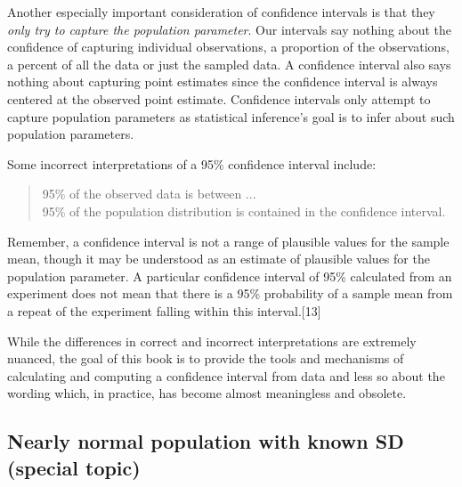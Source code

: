Another especially important consideration of confidence intervals is that they \emph{only try to capture the population parameter}. Our intervals say nothing about the confidence of capturing individual observations, a proportion of the observations, a percent of all the data or just the sampled data. A confidence interval also says nothing about capturing point estimates since the confidence interval is always centered at the observed point estimate.  Confidence intervals only attempt to capture population parameters as statistical inference's goal is to infer about such population parameters.

Some incorrect interpretations of a 95\% confidence interval include: 
\begin{quote}
95\% of the observed data is between ...\\
95\% of the population distribution is contained in the confidence interval.\\
\end{quote}

Remember, a confidence interval is not a range of plausible values for the sample mean, though it may be understood as an estimate of plausible values for the population parameter.
A particular confidence interval of 95\% calculated from an experiment does not mean that there is a 95\% probability of a sample mean from a repeat of the experiment falling within this interval.[13]

While the differences in correct and incorrect interpretations are extremely nuanced, the goal of this book is to provide the tools and mechanisms of calculating and computing a confidence interval from data and less so about the wording which, in practice, has become almost meaningless and obsolete. 


\subsection[Nearly normal population with known SD (special topic)]{Nearly normal population with known SD (special topic)}
\label{nearlyNormalPopWithKnownSD}


